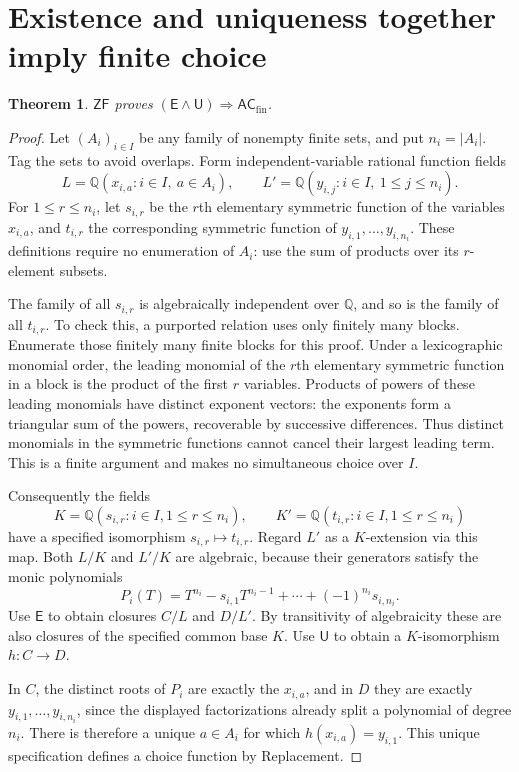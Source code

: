 \documentclass[11pt,a4paper]{article}
\newtheorem{theorem}{Theorem}[section]
\theoremstyle{definition}\newtheorem{definition}[theorem]{Definition}
\theoremstyle{remark}\newtheorem{remark}[theorem]{Remark}
\newcommand{\ZF}{\mathsf{ZF}}\newcommand{\ZFA}{\mathsf{ZFA}}
\newcommand{\E}{\mathsf E}\newcommand{\U}{\mathsf U}
\newcommand{\ACfin}{\mathsf{AC}_{\mathrm{fin}}}
\newcommand{\Q}{\mathbb Q}\newcommand{\F}{\mathbb F}
\begin{document}
\section{Existence and uniqueness together imply finite choice}\label{sec:acfin}
\begin{theorem}\label{thm:acfin}
$\ZF$ proves $(\E\wedge\U)\Rightarrow\ACfin$.
\end{theorem}
\begin{proof}
Let $(A_i)_{i\in I}$ be any family of nonempty finite sets, and put $n_i=|A_i|$. Tag the sets to avoid overlaps. Form independent-variable rational function fields
\[
L=\Q(x_{i,a}:i\in I,\ a\in A_i),\qquad
L'=\Q(y_{i,j}:i\in I,\ 1\leq j\leq n_i).
\]
For $1\leq r\leq n_i$, let $s_{i,r}$ be the $r$th elementary symmetric function of the variables $x_{i,a}$, and $t_{i,r}$ the corresponding symmetric function of $y_{i,1},\ldots,y_{i,n_i}$. These definitions require no enumeration of $A_i$: use the sum of products over its $r$-element subsets.

The family of all $s_{i,r}$ is algebraically independent over $\Q$, and so is the family of all $t_{i,r}$. To check this, a purported relation uses only finitely many blocks. Enumerate those finitely many finite blocks for this proof. Under a lexicographic monomial order, the leading monomial of the $r$th elementary symmetric function in a block is the product of the first $r$ variables. Products of powers of these leading monomials have distinct exponent vectors: the exponents form a triangular sum of the powers, recoverable by successive differences. Thus distinct monomials in the symmetric functions cannot cancel their largest leading term. This is a finite argument and makes no simultaneous choice over $I$.

Consequently the fields
\[
K=\Q(s_{i,r}:i\in I,1\leq r\leq n_i),\qquad
K'=\Q(t_{i,r}:i\in I,1\leq r\leq n_i)
\]
have a specified isomorphism $s_{i,r}\mapsto t_{i,r}$. Regard $L'$ as a $K$-extension via this map. Both $L/K$ and $L'/K$ are algebraic, because their generators satisfy the monic polynomials
\[
P_i(T)=T^{n_i}-s_{i,1}T^{n_i-1}+\cdots+(-1)^{n_i}s_{i,n_i}.
\]
Use $\E$ to obtain closures $C/L$ and $D/L'$. By transitivity of algebraicity these are also closures of the specified common base $K$. Use $\U$ to obtain a $K$-isomorphism $h:C\to D$.

In $C$, the distinct roots of $P_i$ are exactly the $x_{i,a}$, and in $D$ they are exactly $y_{i,1},\ldots,y_{i,n_i}$, since the displayed factorizations already split a polynomial of degree $n_i$. There is therefore a unique $a\in A_i$ for which $h(x_{i,a})=y_{i,1}$. This unique specification defines a choice function by Replacement.
\end{proof}
\end{document}
